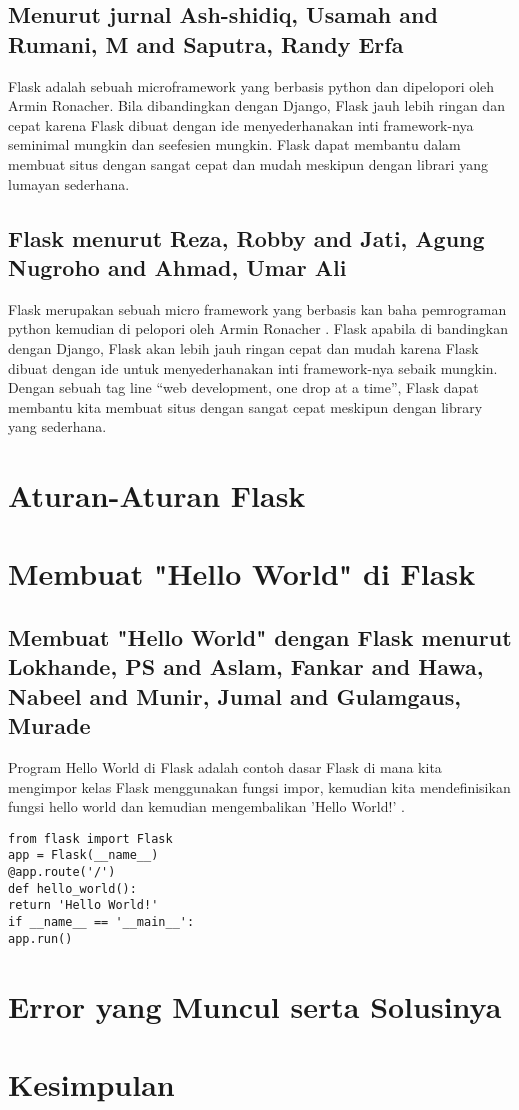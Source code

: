\documentclass[12pt]{article}
\begin{document}
\subsection{Menurut jurnal Ash-shidiq, Usamah and Rumani, M and Saputra, Randy Erfa}
Flask adalah sebuah microframework yang berbasis python dan dipelopori oleh Armin Ronacher. Bila dibandingkan dengan Django, Flask jauh lebih ringan dan cepat karena Flask dibuat dengan ide menyederhanakan inti framework-nya seminimal mungkin dan seefesien mungkin. Flask dapat membantu dalam membuat situs dengan sangat cepat dan mudah meskipun dengan librari yang lumayan sederhana\cite{ash2017perancangan}.

\subsection{Flask menurut Reza, Robby and Jati, Agung Nugroho and Ahmad, Umar Ali}
Flask merupakan sebuah micro framework yang berbasis kan baha pemrograman python kemudian di pelopori oleh Armin Ronacher . Flask apabila  di bandingkan dengan Django, Flask akan lebih jauh ringan  cepat dan mudah  karena  Flask  dibuat   dengan  ide  untuk menyederhanakan  inti  framework-nya  sebaik  mungkin. Dengan sebuah tag line “web development, one drop at a time”, Flask dapat membantu kita membuat situs dengan sangat cepat meskipun dengan library yang sederhana\cite{reza2016perancangan}.

\section{Aturan-Aturan Flask}

 
\section{Membuat "Hello World" di Flask}
\subsection{Membuat "Hello World" dengan Flask menurut Lokhande, PS and Aslam, Fankar and Hawa, Nabeel and Munir, Jumal and Gulamgaus, Murade}
Program Hello World di Flask adalah contoh dasar Flask di mana kita mengimpor kelas Flask menggunakan fungsi impor, kemudian kita mendefinisikan fungsi hello world dan kemudian mengembalikan 'Hello World!' \cite{lokhande2015efficient}.
\begin{verbatim}
from flask import Flask
app = Flask(__name__)
@app.route('/')
def hello_world():
return 'Hello World!'
if __name__ == '__main__':
app.run()
\end{verbatim}


\section{Error yang Muncul serta Solusinya}


\section{Kesimpulan}

	
\end{document}
